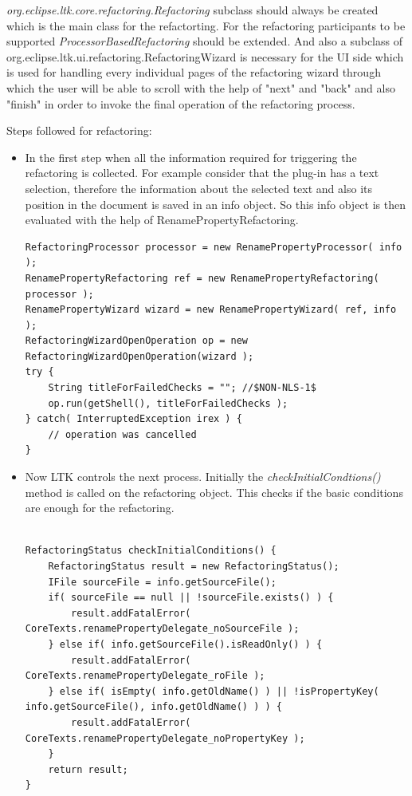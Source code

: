  \emph{org.eclipse.ltk.core.refactoring.Refactoring} subclass should always 
 be created which is the main class for the refactorting. For the 
 refactoring participants to be supported \emph{ProcessorBasedRefactoring}
 should be extended. And also a subclass of org.eclipse.ltk.ui.refactoring.RefactoringWizard
 is necessary for the UI side which is used for handling every
 individual pages of the refactoring wizard through which the
 user will be able to scroll with the help of "next" and "back" and also
 "finish" in order to invoke the final operation of the refactoring
 process.
 
 
 Steps followed for refactoring:
 \begin{itemize}
  \item In the first step when all the information required for 
  triggering the refactoring is collected. For example consider
  that the plug-in has a text selection, therefore the information
  about the selected text and also its position in the 
  document is saved in an info object. So this info object is then
  evaluated with the help of RenamePropertyRefactoring.
  \begin{lstlisting}[caption={Class RenameProperty},label={lst:refac}]
RefactoringProcessor processor = new RenamePropertyProcessor( info );
RenamePropertyRefactoring ref = new RenamePropertyRefactoring( processor ); 
RenamePropertyWizard wizard = new RenamePropertyWizard( ref, info );
RefactoringWizardOpenOperation op = new RefactoringWizardOpenOperation(wizard ); 
try { 
	String titleForFailedChecks = ""; //$NON-NLS-1$ 
	op.run(getShell(), titleForFailedChecks ); 
} catch( InterruptedException irex ) { 
	// operation was cancelled 
}
  \end{lstlisting}

  \item Now LTK controls the next process. Initially the \emph{checkInitialCondtions()}
method is called on the refactoring object. This checks if the
basic conditions are enough for the refactoring. 

  \begin{lstlisting}[caption={Class RenamePropertyDelegate},label={lst:refacDel}]

RefactoringStatus checkInitialConditions() {
	RefactoringStatus result = new RefactoringStatus();
	IFile sourceFile = info.getSourceFile();
	if( sourceFile == null || !sourceFile.exists() ) {
		result.addFatalError( CoreTexts.renamePropertyDelegate_noSourceFile );
	} else if( info.getSourceFile().isReadOnly() ) {
		result.addFatalError( CoreTexts.renamePropertyDelegate_roFile );
	} else if( isEmpty( info.getOldName() ) || !isPropertyKey( info.getSourceFile(), info.getOldName() ) ) {
		result.addFatalError( CoreTexts.renamePropertyDelegate_noPropertyKey );
	}
	return result;
}
\end{lstlisting}


\end{itemize}
